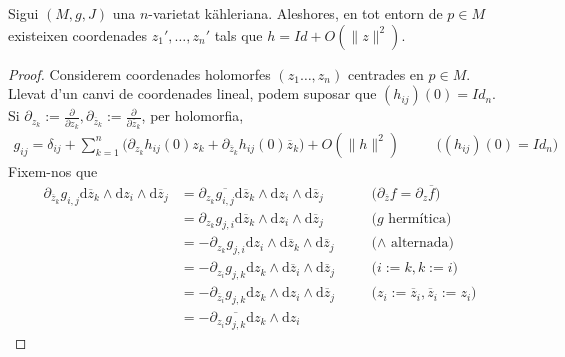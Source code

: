 \begin{lema}
    Sigui $(M,g,J)$ una $n$-varietat kähleriana. Aleshores, en tot entorn de $p\in M$ existeixen coordenades $z_{1}',\ldots,z_{n}'$ tals que $h=Id+O(\|z\|^{2})$.
    \begin{proof}
        Considerem coordenades holomorfes $(z_{1}\ldots,z_{n})$ centrades en $p\in M$. Llevat d'un canvi de coordenades lineal, podem suposar que $(h_{ij})(0)=Id_{n}$. Si $\partial_{z_{k}}:=\frac{\partial}{\partial z_{k}},\partial_{\overline{z}_{k}}:=\frac{\partial}{\partial\overline{z}_{k}}$, per holomorfia,
        \begin{align*}
            g_{ij}
            =\delta_{ij}
            +\sum_{k=1}^{n}\big(\partial_{z_{k}}h_{ij}(0)z_{k}+\partial_{\overline{z}_{k}}h_{ij}(0)\overline{z}_{k}\big)
            +O(\|h\|^{2})
            &\quad&\textrm{($(h_{ij})(0)=Id_{n}$)}
        \end{align*}
        Fixem-nos que
        \begin{align*}
            \partial_{\overline{z}_{k}}g_{i,j}
            \textrm{d}\overline{z}_{k}
            \wedge\textrm{d}z_{i}
            \wedge\textrm{d}\overline{z}_{j}
            &=\partial_{z_{k}}\overline{g_{i,j}}
            \textrm{d}\overline{z}_{k}
            \wedge\textrm{d}z_{i}
            \wedge\textrm{d}\overline{z}_{j}
            &\quad&\textrm{($\partial_{\overline{z}}f=\partial_{z}\overline{f}$)}\\
            &=\partial_{z_{k}}g_{j,i}
            \textrm{d}\overline{z}_{k}
            \wedge\textrm{d}z_{i}
            \wedge\textrm{d}\overline{z}_{j}
            &\quad&\textrm{($g$ hermítica)}\\
            &=-\partial_{z_{k}}g_{j,i}
            \textrm{d}z_{i}
            \wedge\textrm{d}\overline{z}_{k}
            \wedge\textrm{d}\overline{z}_{j}
            &\quad&\textrm{($\wedge$ alternada)}\\
            &=-\partial_{z_{i}}g_{j,k}
            \textrm{d}z_{k}
            \wedge\textrm{d}\overline{z}_{i}
            \wedge\textrm{d}\overline{z}_{j}
            &\quad&\textrm{($i:=k,k:=i$)}\\
            &=-\partial_{\overline{z}_{i}}g_{j,k}
            \textrm{d}z_{k}
            \wedge\textrm{d}z_{i}
            \wedge\textrm{d}\overline{z}_{j}
            &\quad&\textrm{($z_{i}:=\overline{z}_{i},\overline{z}_{i}:=z_{i}$)}\\
            &=-\partial_{z_{i}}\overline{g_{j,k}}
            \textrm{d}z_{k}
            \wedge\textrm{d}z_{i}

\end{align*}
\end{proof}
\end{lema}
